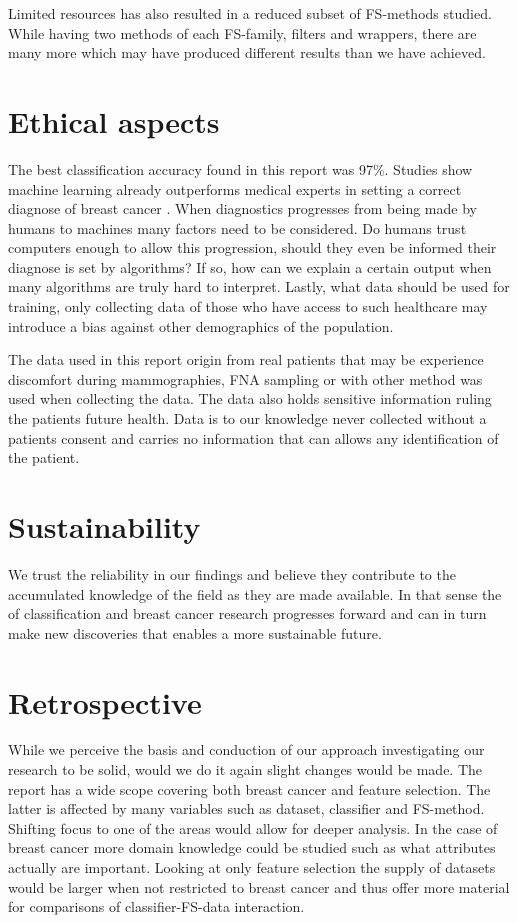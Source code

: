 Limited resources has also resulted in a reduced subset of FS-methods studied. While having two methods of each FS-family, filters and wrappers, there are many more which may have produced different results than we have achieved.


\section{Ethical aspects}

The best classification accuracy found in this report was 97\%. Studies show machine learning already outperforms medical experts in setting a correct diagnose of breast cancer \parencite{fnab}. When diagnostics progresses from being made by humans to machines many factors need to be considered. Do humans trust computers enough to allow this progression, should they even be informed their diagnose is set by algorithms? If so, how can we explain a certain output when many algorithms are truly hard to interpret. Lastly, what data should be used for training, only collecting data of those who have access to such healthcare may introduce a bias against other demographics of the population.

The data used in this report origin from real patients that may be experience discomfort during mammographies, FNA sampling or with other method was used when collecting the data. The data also holds sensitive information ruling the patients future health. Data is to our knowledge never collected without a patients consent and carries no information that can allows any identification of the patient.

\section{Sustainability}

We trust the reliability in our findings and believe they contribute to the accumulated knowledge of the field as they are made available. In that sense the of classification and breast cancer research progresses forward and can in turn make new discoveries that enables a more sustainable future.

\section{Retrospective}

While we perceive the basis and conduction of our approach investigating our research to be solid, would we do it again slight changes would be made. The report has a wide scope covering both breast cancer and feature selection. The latter is affected by many variables such as dataset, classifier and FS-method. Shifting focus to one of the areas would allow for deeper analysis. In the case of breast cancer more domain knowledge could be studied such as what attributes actually are important. Looking at only feature selection the supply of datasets would be larger when not restricted to breast cancer and thus offer more material for comparisons of classifier-FS-data interaction.
